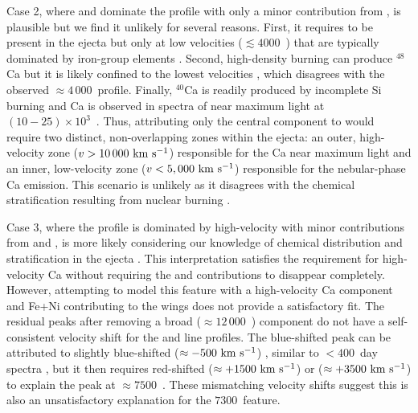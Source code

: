 \documentclass[twocolumn]{aastex63}
\begin{document}
Case 2, where  and  dominate the profile with only a minor contribution from \CaII, is plausible but we find it unlikely for several reasons. First, it requires \CaII to be present in the ejecta but only at low velocities ($\lesssim 4000$~\kms) that are typically dominated by iron-group elements \citep[IGEs; e.g., ][]{ruizlapuente1992, liu1997}. Second, high-density burning can produce $^{48}$Ca \citep{meyer1996, dominguez2000} but it is likely confined to the lowest velocities \cite[$\lesssim 1000$~\kms; e.g, ][]{galbany2019}, which disagrees with the observed $\approx 4\,000$~\kms profile. Finally, $^{40}$Ca is readily produced by incomplete Si burning \citep[e.g., ][]{thielemann1986} and Ca is observed in spectra of \name near maximum light at $(10-25)\times 10^3$~\kms \citep[e.g., ][]{parrent2012, pereira2013, zhang2016}. Thus, attributing only the central component to \CaII would require two distinct, non-overlapping zones within the ejecta: an outer, high-velocity zone ($v > 10\,000~\rm{km}~\rm s^{-1}$) responsible for the Ca near maximum light and an inner, low-velocity zone ($v < 5,000~\rm{km}~\rm s ^{-1}$) responsible for the nebular-phase Ca emission. This scenario is unlikely as it disagrees with the chemical stratification resulting from nuclear burning \citep[e.g., ][]{nomoto1984, thielemann1986}. 

Case 3, where the profile is dominated by high-velocity \CaII with minor contributions from  and , is more likely considering our knowledge of chemical distribution and stratification in the ejecta \citep[e.g., ][]{wilk2020}. This interpretation satisfies the requirement for high-velocity Ca without requiring the  and  contributions to disappear completely. However, attempting to model this feature with a high-velocity Ca component and Fe+Ni contributing to the wings does not provide a satisfactory fit. The residual peaks after removing a broad ($\approx 12\,000$~\kms) \CaII component do not have a self-consistent velocity shift for the  and  line profiles. The blue-shifted peak can be attributed to slightly blue-shifted ($\approx -500~\rm{km}~\rm s^{-1}$) , similar to $<400$~day spectra \citep[e.g., ][]{mcclelland2013}, but it then requires red-shifted  ($\approx +1500~\rm{km}~\rm s^{-1}$) or  ($\approx + 3500~\rm{km}~\rm{s}^{-1}$) to explain the peak at $\approx 7500$~\AAA. These mismatching velocity shifts suggest this is also an unsatisfactory explanation for the $7300$~\AAA feature. 
\end{document}
